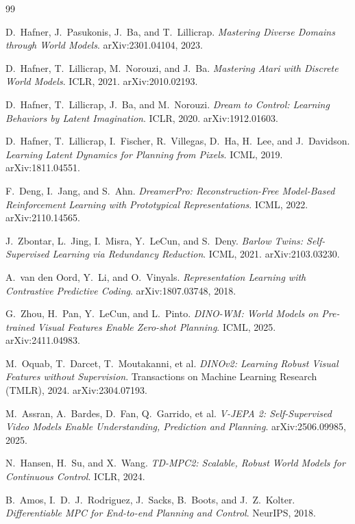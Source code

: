 \documentclass[11pt,a4paper]{article}
\begin{document}
\begin{thebibliography}{99}
\setlength{\itemsep}{2pt}

 D.~Hafner, J.~Pasukonis, J.~Ba, and T.~Lillicrap.
\emph{Mastering Diverse Domains through World Models}. arXiv:2301.04104, 2023.

 D.~Hafner, T.~Lillicrap, M.~Norouzi, and J.~Ba.
\emph{Mastering Atari with Discrete World Models}. ICLR, 2021. arXiv:2010.02193.

 D.~Hafner, T.~Lillicrap, J.~Ba, and M.~Norouzi.
\emph{Dream to Control: Learning Behaviors by Latent Imagination}. ICLR, 2020.
arXiv:1912.01603.

 D.~Hafner, T.~Lillicrap, I.~Fischer, R.~Villegas, D.~Ha,
H.~Lee, and J.~Davidson. \emph{Learning Latent Dynamics for Planning from
Pixels}. ICML, 2019. arXiv:1811.04551.

 F.~Deng, I.~Jang, and S.~Ahn. \emph{DreamerPro:
Reconstruction-Free Model-Based Reinforcement Learning with Prototypical
Representations}. ICML, 2022. arXiv:2110.14565.

 J.~Zbontar, L.~Jing, I.~Misra, Y.~LeCun, and S.~Deny.
\emph{Barlow Twins: Self-Supervised Learning via Redundancy Reduction}. ICML,
2021. arXiv:2103.03230.

 A.~van den Oord, Y.~Li, and O.~Vinyals.
\emph{Representation Learning with Contrastive Predictive Coding}.
arXiv:1807.03748, 2018.

 G.~Zhou, H.~Pan, Y.~LeCun, and L.~Pinto.
\emph{DINO-WM: World Models on Pre-trained Visual Features Enable Zero-shot
Planning}. ICML, 2025. arXiv:2411.04983.

 M.~Oquab, T.~Darcet, T.~Moutakanni, et al.
\emph{DINOv2: Learning Robust Visual Features without Supervision}.
Transactions on Machine Learning Research (TMLR), 2024. arXiv:2304.07193.

 M.~Assran, A.~Bardes, D.~Fan, Q.~Garrido, et al.
\emph{V-JEPA 2: Self-Supervised Video Models Enable Understanding, Prediction
and Planning}. arXiv:2506.09985, 2025.

 N.~Hansen, H.~Su, and X.~Wang.
\emph{TD-MPC2: Scalable, Robust World Models for Continuous Control}. ICLR, 2024.

 B.~Amos, I.~D.~J.~Rodriguez, J.~Sacks, B.~Boots, and
J.~Z.~Kolter. \emph{Differentiable MPC for End-to-end Planning and Control}.
NeurIPS, 2018.


\end{thebibliography}
\end{document}
